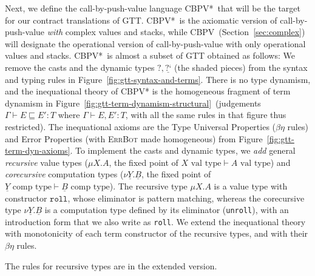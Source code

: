 \documentclass[acmsmall,screen,12pt]{acmart}
\newif\iflong
\renewcommand{\u}{\underline}
\newcommand{\cbpv}{CBPV}
\newcommand{\cbpvstar}{CBPV*}
\newcommand{\vtype}{\,\,\text{val type}}
\newcommand{\ctype}{\,\,\text{comp type}}
\newcommand{\ltdyn}{\sqsubseteq}
\newcommand{\dynv}{{?}}
\newcommand{\dync}{\u {\text{?`}}}
\begin{document}
Next, we define the call-by-push-value language \cbpvstar\ that will be
the target for our contract translations of GTT.
%
\cbpvstar\ is the axiomatic version of call-by-push-value \emph{with}
complex values and stacks, while \cbpv\ (Section~\ref{sec:complex}) will
designate the operational version of call-by-push-value with only
operational values and stacks.
%
\cbpvstar\ is almost a subset of GTT obtained as follows: We remove the
casts and the dynamic types $\dynv, \dync$ (the shaded pieces) from the
syntax and typing rules in Figure~\ref{fig:gtt-syntax-and-terms}.  There
is no type dynamism, and the inequational theory of \cbpv* is the
homogeneous fragment of term dynamism in
Figure~\ref{fig:gtt-term-dynamism-structural}\iflong\ and Figure~\ref{fig:gtt-term-dynamism-ext-congruence}\fi\ (judgements $\Gamma \vdash
E \ltdyn E' : T$ where $\Gamma \vdash E,E' : T$, with all the same rules
in that figure thus restricted).  The inequational axioms are the
Type Universal Properties ($\beta\eta$ rules)
and Error Properties (with \textsc{ErrBot} made homogeneous) from 
Figure~\ref{fig:gtt-term-dyn-axioms}.
%
To implement the casts and dynamic types, we \emph{add} general
\emph{recursive} value types ($\mu X.A$, the fixed point of $X \vtype
\vdash A \vtype$) and \emph{corecursive} computation types ($\nu \u Y.\u
B$, the fixed point of $\u Y \ctype \vdash \u B \ctype$).
%
The recursive type $\mu X.A$ is a value type with constructor
$\texttt{roll}$, whose eliminator is pattern matching, whereas the
corecursive type $\nu \u Y.\u B$ is a computation type defined by its
eliminator (\texttt{unroll}), with an introduction form that we also write
as \texttt{roll}.
%
We extend the inequational theory with monotonicity of each term constructor of
the recursive types, and with their $\beta\eta$ rules.
\begin{shortonly}
The rules for recursive types are in the extended version.
\end{shortonly}
\end{document}
